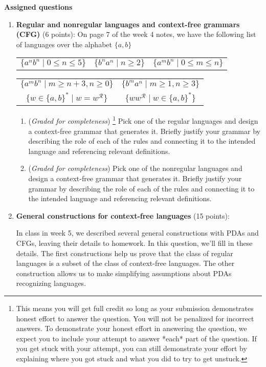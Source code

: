 \documentclass[12pt, oneside]{article}
\newcommand{\gradeComplete}{({\it Graded for completeness}) }
\newcommand{\gradeCompleteFirst}{\gradeComplete\footnote{This means you will 
get full credit so long as your submission demonstrates honest effort to 
answer the question. You will not be penalized for incorrect answers. 
To demonstrate your honest effort in answering the question, we 
expect you to include your attempt to answer *each* part of the question. 
If you get stuck with your attempt, you can still demonstrate 
your effort by explaining where you got stuck and what 
you did to try to get unstuck.} }
\begin{document}
{\bf Assigned questions}
\begin{enumerate}[wide, labelwidth=!, labelindent=0pt]


\item \textbf{Regular and nonregular languages and context-free grammars (CFG)} (6 points): 
On page 7 of the week 4 notes, we have the following list of languages over the alphabet $\{a,b\}$

\begin{center}
\begin{tabular}{ccc}
    $\{a^nb^n \mid 0  \leq n  \leq 5 \}$
    &$\{b^n a^n \mid  n  \geq 2\}$
    &$\{a^m b^n \mid  0 \leq m\leq n\}$
\end{tabular}
\begin{tabular}{cc}
    $\{a^m b^n \mid  m \geq n+3,  n \geq 0\}$
    &$\{b^m a^n \mid  m \geq 1, n \geq  3\}$\\
    $\{ w  \in \{a,b\}^* \mid w = w^\mathcal{R} \}$
    &$\{ ww^\mathcal{R} \mid w\in \{a,b\}^* \}$ \\
\end{tabular}
\end{center}
\begin{enumerate}
    \item\gradeCompleteFirst Pick one of the regular languages and design a context-free grammar that generates it. 
    Briefly justify your grammar by describing the role of each of the rules
    and connecting it to the intended language and referencing relevant definitions.
    \item\gradeComplete Pick one of the nonregular languages and design a context-free grammar that generates it.  Briefly justify your grammar by describing the role of each of the rules
    and connecting it to the intended language and referencing relevant definitions.
\end{enumerate}

\item \textbf{General constructions for context-free languages} (15 points):

In class in week 5, we described several general constructions 
with PDAs and CFGs, leaving their details to
homework. In this question, we'll fill in these details. The first constructions
help us prove that the class of regular languages is a subset of the
class of context-free languages. The other construction allows us 
to make simplifying assumptions about PDAs recognizing languages.

\begin{enumerate}


\end{enumerate}
\end{enumerate}
\end{document}
